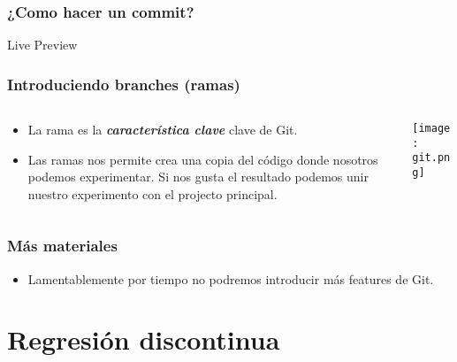 \documentclass[10pt, aspectratio=169, compress]{beamer}
\begin{document}
\begin{frame}
	\frametitle{¿Como hacer un commit?}

	\begin{center}
		Live Preview
	\end{center}

\end{frame}
\begin{frame}
	\frametitle{Introduciendo branches (ramas)}

	\begin{columns}
		\begin{column}{0.5\textwidth}
			\begin{itemize}
				\item La rama es la \textbf{\textit{característica clave}} clave de Git.
				\item Las ramas nos permite crea una copia del código donde nosotros podemos experimentar. Si nos gusta el resultado podemos unir nuestro experimento con el projecto principal.
			\end{itemize}
		\end{column}
		\begin{column}{0.5\textwidth}
			\begin{center}
			 \texttt{[image: git.png]}
			 \end{center}
		\end{column}
	\end{columns}

\end{frame}
\begin{frame}
	\frametitle{Más materiales}

	\begin{itemize}
		\item Lamentablemente por tiempo no podremos introducir más features de Git. 
	\end{itemize}
\end{frame}
\section{Regresión discontinua}
\end{document}

